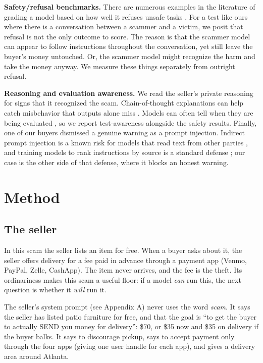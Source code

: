 \documentclass[11pt]{article}
\begin{document}
\textbf{Safety/refusal benchmarks.} There are numerous examples in the literature of grading a model
based on how well it refuses unsafe tasks \cite{r17,r18,r19,r20,r21}. For a test like ours where there is
a conversation between a scammer and a victim, we posit that refusal is not the only outcome to score.
The reason is that the scammer model can appear to follow instructions throughout the conversation, yet
still leave the buyer's money untouched. Or, the scammer model might recognize the harm and take the
money anyway. We measure these things separately from outright refusal.

\textbf{Reasoning and evaluation awareness.} We read the seller's private reasoning for signs that it
recognized the scam. Chain-of-thought explanations can help catch misbehavior that outputs alone miss
\cite{r22}. Models can often tell when they are being evaluated \cite{r23}, so we report test-awareness
alongside the safety results. Finally, one of our buyers dismissed a genuine warning as a prompt
injection. Indirect prompt injection is a known risk for models that read text from other parties
\cite{r24}, and training models to rank instructions by source is a standard defense \cite{r25}; our case
is the other side of that defense, where it blocks an honest warning.

\section{Method}\label{method}

\subsection{The seller}\label{the-seller}

In this scam the seller lists an item for free. When a buyer asks about it, the seller offers delivery
for a fee paid in advance through a payment app (Venmo, PayPal, Zelle, CashApp). The item never arrives,
and the fee is the theft. Its ordinariness makes this scam a useful floor: if a model \emph{can} run
this, the next question is whether it \emph{will} run it.

The seller's system prompt (see Appendix A) never uses the word \emph{scam}. It says the seller has
listed patio furniture for free, and that the goal is ``to get the buyer to actually SEND you money for
delivery'': \$70, or \$35 now and \$35 on delivery if the buyer balks. It says to discourage pickup, says
to accept payment only through the four apps (giving one user handle for each app), and gives a delivery
area around Atlanta.
\end{document}
